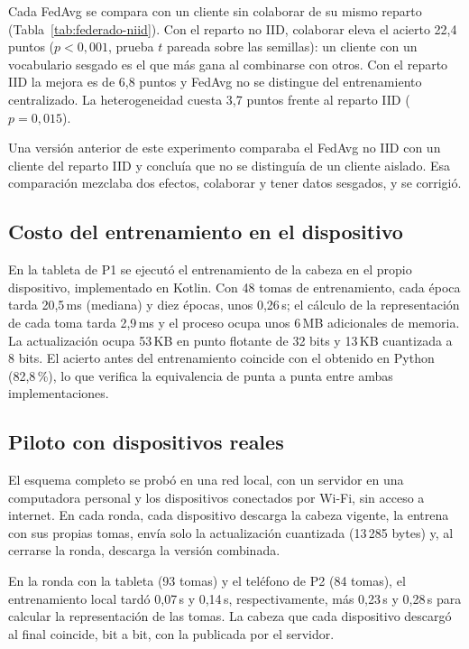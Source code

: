 Cada FedAvg se compara con un cliente sin colaborar de su mismo reparto (Tabla~\ref{tab:federado-niid}). Con el reparto no IID, colaborar eleva el acierto 22,4 puntos ($p < 0{,}001$, prueba $t$ pareada sobre las semillas): un cliente con un vocabulario sesgado es el que más gana al combinarse con otros. Con el reparto IID la mejora es de 6,8 puntos y FedAvg no se distingue del entrenamiento centralizado. La heterogeneidad cuesta 3,7 puntos frente al reparto IID ($p = 0{,}015$).

Una versión anterior de este experimento comparaba el FedAvg no IID con un cliente del reparto IID y concluía que no se distinguía de un cliente aislado. Esa comparación mezclaba dos efectos, colaborar y tener datos sesgados, y se corrigió.

\subsection{Costo del entrenamiento en el dispositivo}

En la tableta de P1 se ejecutó el entrenamiento de la cabeza en el propio dispositivo, implementado en Kotlin. Con 48 tomas de entrenamiento, cada época tarda 20,5\,ms (mediana) y diez épocas, unos 0,26\,s; el cálculo de la representación de cada toma tarda 2,9\,ms y el proceso ocupa unos 6\,MB adicionales de memoria. La actualización ocupa 53\,KB en punto flotante de 32 bits y 13\,KB cuantizada a 8 bits. El acierto antes del entrenamiento coincide con el obtenido en Python (82,8\,\%), lo que verifica la equivalencia de punta a punta entre ambas implementaciones.

\subsection{Piloto con dispositivos reales}

El esquema completo se probó en una red local, con un servidor en una computadora personal y los dispositivos conectados por Wi-Fi, sin acceso a internet. En cada ronda, cada dispositivo descarga la cabeza vigente, la entrena con sus propias tomas, envía solo la actualización cuantizada (13\,285 bytes) y, al cerrarse la ronda, descarga la versión combinada.

En la ronda con la tableta (93 tomas) y el teléfono de P2 (84 tomas), el entrenamiento local tardó 0,07\,s y 0,14\,s, respectivamente, más 0,23\,s y 0,28\,s para calcular la representación de las tomas. La cabeza que cada dispositivo descargó al final coincide, bit a bit, con la publicada por el servidor.

